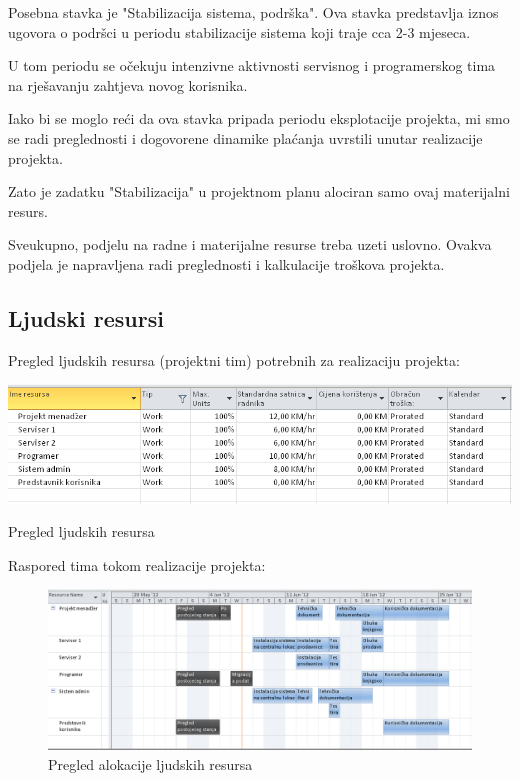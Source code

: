 \documentclass[times, utf8, seminar]{fit}
\begin{document}
Posebna stavka je "Stabilizacija sistema, podrška". Ova stavka predstavlja iznos ugovora o podršci u periodu stabilizacije sistema koji traje cca 2-3 mjeseca.

U tom periodu se očekuju intenzivne aktivnosti servisnog i programerskog tima na rješavanju zahtjeva novog korisnika.

Iako bi se moglo reći da ova stavka pripada periodu eksplotacije projekta, mi smo se radi preglednosti i dogovorene dinamike plaćanja uvrstili unutar realizacije projekta.

Zato je zadatku "Stabilizacija" u projektnom planu alociran samo ovaj materijalni resurs.

Sveukupno, podjelu na radne i materijalne resurse treba uzeti uslovno. Ovakva podjela je napravljena radi preglednosti i kalkulacije troškova projekta.  

\subsection{Ljudski resursi}
Pregled ljudskih resursa (projektni tim) potrebnih za realizaciju projekta:

\begin{table}[!h]
\centering
\includegraphics[width=15.5cm]{img/ljudski_resursi.png}
\caption{Pregled ljudskih resursa}
\end{table}

Raspored tima tokom realizacije projekta:

\begin{figure}[!h]
\centering
\includegraphics[width=15.5cm]{img/team_planner.png}
\caption{Pregled alokacije ljudskih resursa}
\end{figure}
\end{document}
